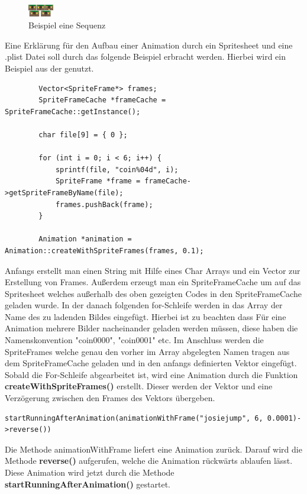\begin{figure}[H]
  \includegraphics[width=0.1\textwidth]{resources/dokubaum}
  \caption{Beispiel eine Sequenz}
  \label{fig:josie} 
\end{figure}

Eine Erklärung für den Aufbau einer Animation durch ein Spritesheet und eine .plist Datei soll durch das folgende Beispiel erbracht werden. Hierbei wird ein Beispiel aus der  genutzt. 

\begin{lstlisting}
		Vector<SpriteFrame*> frames;
		SpriteFrameCache *frameCache = SpriteFrameCache::getInstance();

		char file[9] = { 0 };

		for (int i = 0; i < 6; i++) {
			sprintf(file, "coin%04d", i);
			SpriteFrame *frame = frameCache->getSpriteFrameByName(file);
			frames.pushBack(frame);
		}

		Animation *animation = Animation::createWithSpriteFrames(frames, 0.1);
\end{lstlisting}

Anfangs erstellt man einen String mit Hilfe eines Char Arrays und ein Vector zur Erstellung von Frames. Außerdem erzeugt man ein SpriteFrameCache um auf das Spritesheet welches außerhalb des oben gezeigten Codes in den SpriteFrameCache geladen wurde. In der danach folgenden for-Schleife werden
in das Array der Name des zu ladenden Bildes eingefügt. Hierbei ist zu beachten dass Für eine Animation mehrere Bilder nacheinander geladen werden müssen, diese haben die Namenskonvention "coin0000", "coin0001" etc. Im Anschluss werden die SpriteFrames welche genau den vorher im Array abgelegten Namen tragen aus dem SpriteFrameCache geladen und in den anfangs definierten Vektor eingefügt. 
Sobald die For-Schleife abgearbeitet ist, wird eine Animation durch die Funktion \textbf{createWithSpriteFrames()} erstellt. Dieser werden der Vektor und eine Verzögerung zwischen den Frames des Vektors übergeben.

\begin{lstlisting}
startRunningAfterAnimation(animationWithFrame("josiejump", 6, 0.0001)->reverse())
\end{lstlisting}

Die Methode animationWithFrame liefert eine Animation zurück. Darauf wird die Methode \textbf{reverse()} aufgerufen, welche die Animation rückwärts ablaufen lässt. Diese Animation wird jetzt durch die Methode \textbf{startRunningAfterAnimation()} gestartet. 

